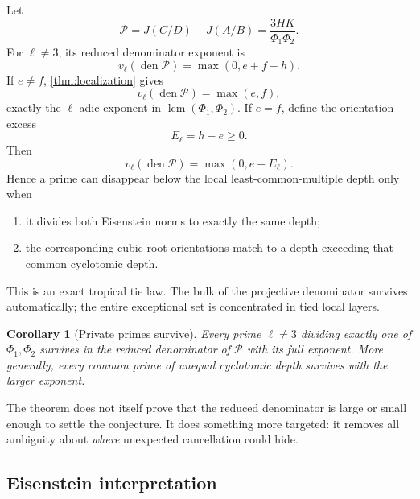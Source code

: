 \documentclass[11pt]{article}
\newtheorem{corollary}[theorem]{Corollary}
\theoremstyle{definition}
\theoremstyle{remark}
\newcommand{\den}{\operatorname{den}}
\newcommand{\lcm}{\operatorname{lcm}}
\begin{document}
Let
\begin{equation}\label{eq:projective-diff}
 \mathscr P=J(C/D)-J(A/B)=\frac{3HK}{\Phi_1\Phi_2}.
\end{equation}
For $\ell\ne3$, its reduced denominator exponent is
\begin{equation}\label{eq:den-local}
 v_\ell(\den\mathscr P)
 =\max(0,e+f-h).
\end{equation}
If $e\ne f$, \cref{thm:localization} gives
\begin{equation}\label{eq:lcm-survival}
 v_\ell(\den\mathscr P)=\max(e,f),
\end{equation}
exactly the $\ell$-adic exponent in $\lcm(\Phi_1,\Phi_2)$.  If $e=f$, define the orientation excess
\begin{equation}\label{eq:orientation-excess}
 E_\ell=h-e\ge0.
\end{equation}
Then
\begin{equation}\label{eq:tied-den}
 v_\ell(\den\mathscr P)=\max(0,e-E_\ell).
\end{equation}
Hence a prime can disappear below the local least-common-multiple depth only when
\begin{enumerate}
\item it divides both Eisenstein norms to exactly the same depth;
\item the corresponding cubic-root orientations match to a depth exceeding that common cyclotomic depth.
\end{enumerate}
This is an exact tropical tie law.  The bulk of the projective denominator survives automatically; the entire exceptional set is concentrated in tied local layers.

\begin{corollary}[Private primes survive]\label{cor:private-survive}
Every prime $\ell\ne3$ dividing exactly one of $\Phi_1,\Phi_2$ survives in the reduced denominator of $\mathscr P$ with its full exponent.  More generally, every common prime of unequal cyclotomic depth survives with the larger exponent.
\end{corollary}

The theorem does not itself prove that the reduced denominator is large or small enough to settle the conjecture.  It does something more targeted: it removes all ambiguity about \emph{where} unexpected cancellation could hide.

\subsection{Eisenstein interpretation}
\end{document}
